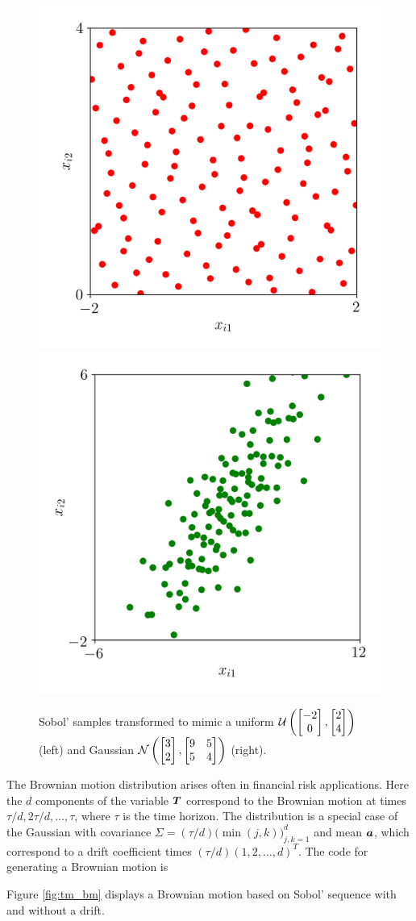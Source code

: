 \documentclass[graybox,footinfo]{svmult}
\newcommand{\mSigma}{\mathsf{\Sigma}}
\begin{document}
\begin{figure}
	\includegraphics[width=.45\textwidth]{ags/figs/tm.uniform.png} 
	\includegraphics[width=.45\textwidth]{ags/figs/tm.gaussian.png}
	\caption{Sobol' samples transformed to mimic a uniform ${\mathcal{U}}\left(\begin{bmatrix} -2 \\ 0 \end{bmatrix}, \begin{bmatrix} 2 \\ 4 \end{bmatrix} \right)$ (left) and  Gaussian ${\mathcal{N}}\left(\begin{bmatrix} 3 \\ 2 \end{bmatrix}, \begin{bmatrix} 9 & 5 \\ 5 & 4 \end{bmatrix} \right)$ (right).}
	\label{fig:tm_ug}
\end{figure}

The Brownian motion distribution arises often in financial risk applications.  Here the $d$ components of the variable ${\boldsymbol{T}}$ correspond to the Brownian motion at times $\tau/d, 2\tau/d, \ldots, \tau$, where $\tau$ is the time horizon.  The distribution is a special case of the Gaussian with covariance $\mSigma = (\tau/d) \bigl (\min(j,k) \bigr)_{j,k=1}^d$ and mean ${\boldsymbol{a}}$, which  correspond to a drift coefficient times $(\tau/d)(1, 2, \ldots, d)^T$.  The code for generating a Brownian motion is

Figure \ref{fig:tm_bm} displays a Brownian motion based on Sobol' sequence with and without a drift.
\end{document}
